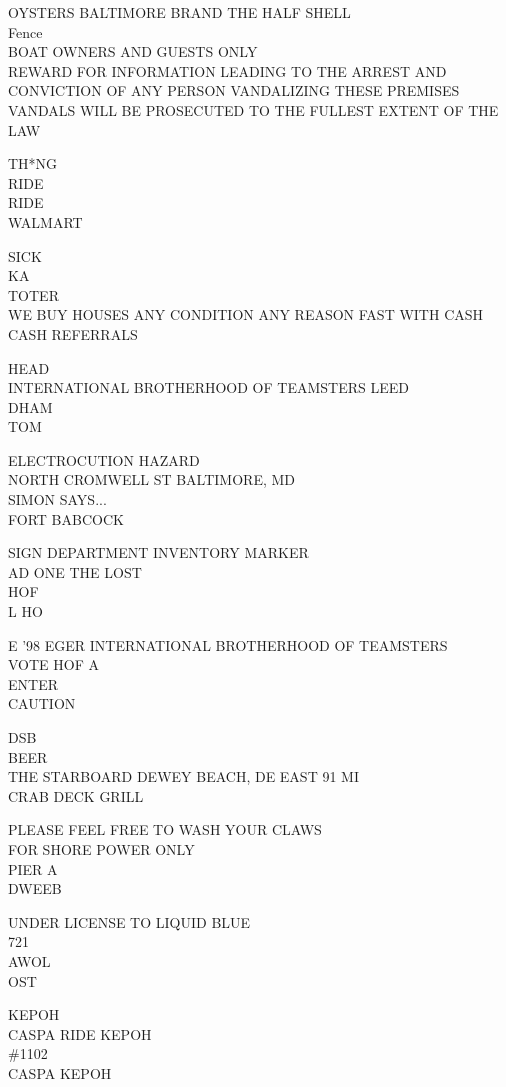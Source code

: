 \documentclass[10pt,letterpaper]{article}
\begin{document}
OYSTERS BALTIMORE BRAND THE HALF SHELL\\
Fence\\
BOAT OWNERS AND GUESTS ONLY\\
REWARD FOR INFORMATION LEADING TO THE ARREST AND CONVICTION OF ANY PERSON VANDALIZING THESE PREMISES VANDALS WILL BE PROSECUTED TO THE FULLEST EXTENT OF THE LAW

TH*NG\\
RIDE\\
RIDE\\
WALMART

SICK\\
KA\\
TOTER\\
WE BUY HOUSES ANY CONDITION ANY REASON FAST WITH CASH CASH REFERRALS

HEAD\\
INTERNATIONAL BROTHERHOOD OF TEAMSTERS LEED\\
DHAM\\
TOM

ELECTROCUTION HAZARD\\
NORTH CROMWELL ST BALTIMORE, MD\\
SIMON SAYS...\\
FORT BABCOCK

SIGN DEPARTMENT INVENTORY MARKER\\
AD ONE THE LOST\\
HOF\\
L HO

E '98 EGER INTERNATIONAL BROTHERHOOD OF TEAMSTERS\\
VOTE HOF A\\
ENTER\\
CAUTION

DSB\\
BEER\\
THE STARBOARD DEWEY BEACH, DE EAST 91 MI\\
CRAB DECK GRILL

PLEASE FEEL FREE TO WASH YOUR CLAWS\\
FOR SHORE POWER ONLY\\
PIER A\\
DWEEB

UNDER LICENSE TO LIQUID BLUE\\
721\\
AWOL\\
OST

KEPOH\\
CASPA RIDE KEPOH\\
\#1102\\
CASPA KEPOH
\end{document}
